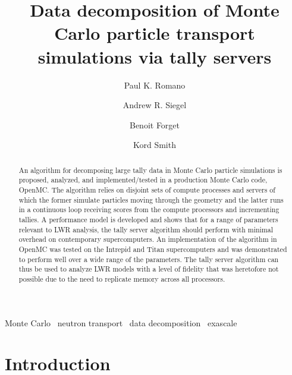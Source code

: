 \documentclass[3p]{elsarticle}
\begin{document}
\begin{frontmatter}

\title{Data decomposition of Monte Carlo particle transport simulations via
  tally servers}
\author[mit]{Paul K. Romano}

\author[anl]{Andrew R. Siegel}

\author[mit]{Benoit Forget}

\author[mit]{Kord Smith}

\address[mit]{Massachusetts Institute of Technology, Department of Nuclear
  Science and Engineering, 77 Massachusetts Avenue, Building 24-213, Cambridge,
  MA 02141}

\address[anl]{Argonne National Laboratory, Mathematics and Computer Science
  Division}

\begin{abstract}
An algorithm for decomposing large tally data in Monte Carlo particle
simulations is proposed, analyzed, and implemented/tested in a production Monte
Carlo code, OpenMC. The algorithm relies on disjoint sets of compute processes
and servers of which the former simulate particles moving through the geometry
and the latter runs in a continuous loop receiving scores from the compute
processors and incrementing tallies. A performance model is developed and shows
that for a range of parameters relevant to LWR analysis, the tally server
algorithm should perform with minimal overhead on contemporary
supercomputers. An implementation of the algorithm in OpenMC was tested on the
Intrepid and Titan supercomputers and was demonstrated to perform well over a
wide range of the parameters. The tally server algorithm can thus be used to
analyze LWR models with a level of fidelity that was heretofore not possible due
to the need to replicate memory across all processors.
\end{abstract}

\begin{keyword}
  Monte Carlo \ neutron transport \ data decomposition \ exascale
\end{keyword}

\end{frontmatter}

\section{Introduction}
\end{document}

